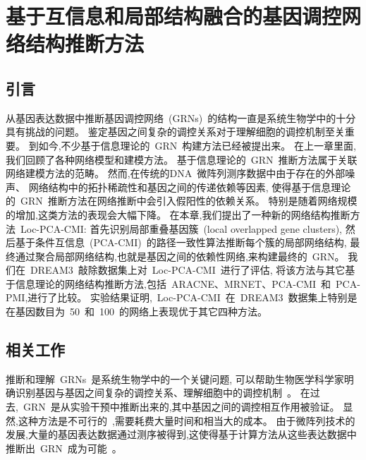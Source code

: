 \section{基于互信息和局部结构融合的基因调控网络结构推断方法}
\label{sec:locpcacmi}

\subsection{引言}

从基因表达数据中推断基因调控网络~(GRNs)~的结构一直是系统生物学中的十分具有挑战的问题。
鉴定基因之间复杂的调控关系对于理解细胞的调控机制至关重要。
到如今,不少基于信息理论的~GRN~构建方法已经被提出来。
在上一章里面, 我们回顾了各种网络模型和建模方法。
基于信息理论的~GRN~推断方法属于关联网络建模方法的范畴。
然而,在传统的DNA~微阵列测序数据中由于存在的外部噪声、
网络结构中的拓扑稀疏性和基因之间的传递依赖等因素,
使得基于信息理论的~GRN~推断方法在网络推断中会引入假阳性的依赖关系。
特别是随着网络规模的增加,这类方法的表现会大幅下降。
在本章,我们提出了一种新的网络结构推断方法~Loc-PCA-CMI:
首先识别局部重叠基因簇~(local overlapped gene clusters),
然后基于条件互信息~(PCA-CMI)~的路径一致性算法推断每个簇的局部网络结构,
最终通过聚合局部网络结构,也就是基因之间的依赖性网络,来构建最终的~GRN。
我们在~DREAM3~敲除数据集上对~Loc-PCA-CMI~进行了评估,
将该方法与其它基于信息理论的网络结构推断方法,包括~ARACNE、MRNET、PCA-CMI~和~PCA-PMI,进行了比较。
实验结果证明,~Loc-PCA-CMI~在~DREAM3~数据集上特别是在基因数目为~50~和~100~的网络上表现优于其它四种方法。

\subsection{相关工作}

推断和理解~GRNs~是系统生物学中的一个关键问题, 
可以帮助生物医学科学家明确识别基因与基因之间复杂的调控关系、理解细胞中的调控机制~\cite{altay2010inferring, basso2005reverse}。
在过去,~GRN~是从实验干预中推断出来的,其中基因之间的调控相互作用被验证。
显然,这种方法是不可行的~\cite{elnitski2006locating},需要耗费大量时间和相当大的成本。
由于微阵列技术的发展,大量的基因表达数据通过测序被得到,这使得基于计算方法从这些表达数据中推断出~GRN~成为可能~\cite{maetschke2013supervised}。

